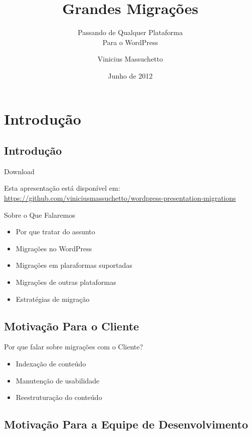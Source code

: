 \documentclass{beamer}
\title{Grandes Migrações}
\subtitle{Passando de Qualquer Plataforma \\
  Para o WordPress}
\author{Vinicius Massuchetto}
\institute{WordCamp Curitiba 2012}
\date{Junho de 2012}
\begin{document}
\frame{\titlepage}

\section{Introdução}

\subsection{Introdução}

\begin{frame}{Download}
  \begin{center}
    Esta apresentação está disponível em: \\
    \url{https://github.com/viniciusmassuchetto/wordpress-presentation-migrations}
  \end{center}
\end{frame}

\begin{frame}{Sobre o Que Falaremos}
\begin{itemize}
  \item Por que tratar do assunto
  \item Migrações no WordPress
  \item Migrações em plaraformas suportadas
  \item Migrações de outras plataformas
  \item Estratégias de migração
\end{itemize}
\end{frame}


\subsection{Motivação Para o Cliente}

\begin{frame}{Por que falar sobre migrações com o Cliente?}
\begin{itemize}
  \pause \item Indexação de conteúdo
  \pause \item Manutenção de usabilidade
  \pause \item Reestruturação do conteúdo
\end{itemize}
\end{frame}

\subsection{Motivação Para a Equipe de Desenvolvimento}
\end{document}

